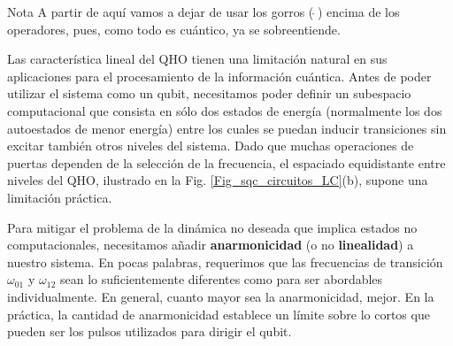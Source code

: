         \begin{mybox_blue}{Nota}
            A partir de aquí vamos a dejar de usar los gorros ($\, \hat{} \,$) encima de los operadores, pues, como todo es cuántico, ya se sobreentiende. 
        \end{mybox_blue}
        
        
    


        Las característica lineal del QHO tienen una limitación natural en sus aplicaciones para el procesamiento de la información cuántica. Antes de poder utilizar el sistema como un qubit, necesitamos poder definir un subespacio computacional que consista en sólo dos estados de energía (normalmente los dos autoestados de menor energía) entre los cuales se puedan inducir transiciones sin excitar también otros niveles del sistema. Dado que muchas operaciones de puertas dependen de la selección de la frecuencia, el espaciado equidistante entre niveles del QHO, ilustrado en la Fig. \ref{Fig_sqc_circuitos_LC}(b), supone una limitación práctica.

        Para mitigar el problema de la dinámica no deseada que implica estados no computacionales, necesitamos añadir \textbf{anarmonicidad} (o no \textbf{linealidad}) a nuestro sistema. En pocas palabras, requerimos que las frecuencias de transición $\omega_{01}$ y $\omega_{12}$ sean lo suficientemente diferentes como para ser abordables individualmente. En general, cuanto mayor sea la anarmonicidad, mejor. En la práctica, la cantidad de anarmonicidad establece un límite sobre lo cortos que pueden ser los pulsos utilizados para dirigir el qubit.

